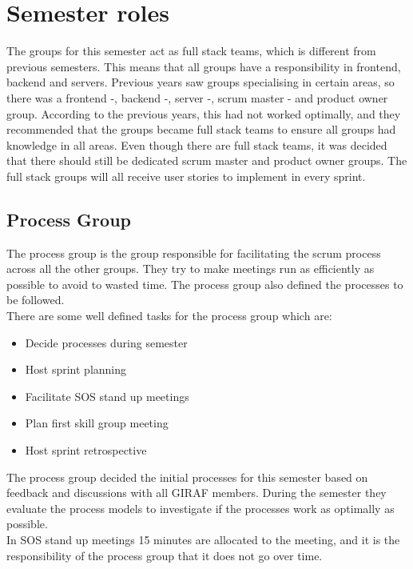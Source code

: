 \section{Semester roles}
The groups for this semester act as full stack teams, which is different from previous semesters. 
This means that all groups have a responsibility in frontend, backend and servers.
Previous years saw groups specialising in certain areas, so there was a frontend -, backend -, server -, scrum master - and product owner group. 
According to the previous years, this had not worked optimally, and they recommended that the groups became full stack teams to ensure all groups had knowledge in all areas.
Even though there are full stack teams, it was decided that there should still be dedicated scrum master and product owner groups. 
The full stack groups will all receive user stories to implement in every sprint.

\subsection{Process Group}
The process group is the group responsible for facilitating the scrum process across all the other groups.
They try to make meetings run as efficiently as possible to avoid to wasted time.
The process group also defined the processes to be followed.
\\
There are some well defined tasks for the process group which are:
\begin{itemize}
    \item Decide processes during semester
    \item Host sprint planning
    \item Facilitate SOS stand up meetings
    \item Plan first skill group meeting
    \item Host sprint retrospective
\end{itemize}
\noindent
The process group decided the initial processes for this semester based on feedback and discussions with all GIRAF members.
During the semester they evaluate the process models to investigate if the processes work as optimally as possible.
\\
In SOS stand up meetings 15 minutes are allocated to the meeting, and it is the responsibility of the process group that it does not go over time.

